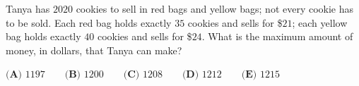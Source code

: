 Tanya has $2020$ cookies to sell in red bags and yellow bags; not every cookie has to be sold. Each red bag holds exactly $35$ cookies and sells for \$$21$; each yellow bag holds exactly $40$ cookies and sells for \$$24$. What is the maximum amount of money, in dollars, that Tanya can make?

$\textbf{(A) }1197\qquad\textbf{(B) }1200\qquad\textbf{(C) }1208\qquad\textbf{(D) }1212\qquad\textbf{(E) }1215$
